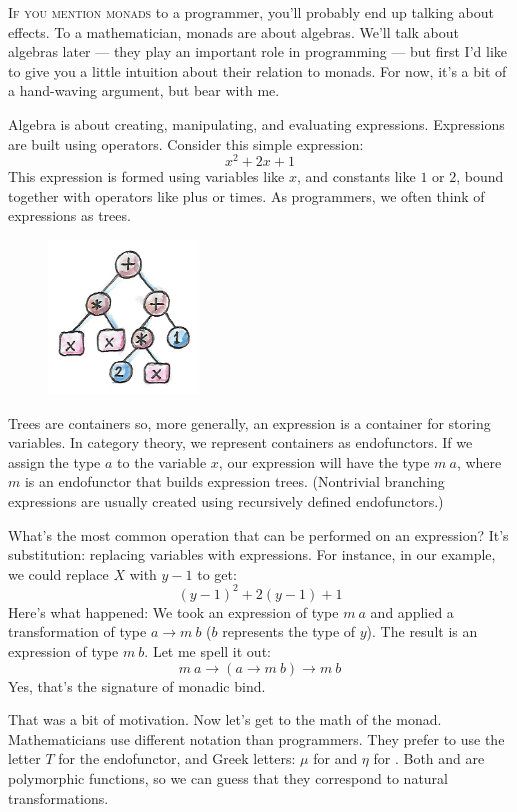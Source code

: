 
\lettrine[lhang=0.17]{I}{f you mention monads} to a programmer, you'll probably end up talking
about effects. To a mathematician, monads are about algebras. We'll talk
about algebras later --- they play an important role in programming ---
but first I'd like to give you a little intuition about their relation
to monads. For now, it's a bit of a hand-waving argument, but bear with
me.

Algebra is about creating, manipulating, and evaluating expressions.
Expressions are built using operators. Consider this simple expression:
\[x^2 + 2 x + 1\]
This expression is formed using variables like $x$, and constants
like $1$ or $2$, bound together with operators like plus or times. As
programmers, we often think of expressions as trees.

\begin{figure}[H]
\centering
\includegraphics[width=40mm]{images/exptree.png}
\end{figure}

\noindent
Trees are containers so, more generally, an expression is a container
for storing variables. In category theory, we represent containers as
endofunctors. If we assign the type $a$ to the variable
$x$, our expression will have the type $m\ a$, where
$m$ is an endofunctor that builds expression trees. (Nontrivial
branching expressions are usually created using recursively defined
endofunctors.)

What's the most common operation that can be performed on an expression?
It's substitution: replacing variables with expressions. For instance,
in our example, we could replace $X$ with $y - 1$ to
get:
\[(y - 1)^2 + 2 (y - 1) + 1\]
Here's what happened: We took an expression of type $m\ a$ and
applied a transformation of type $a \to m\ b$
($b$ represents the type of $y$). The result is an
expression of type $m\ b$. Let me spell it out:
\[m\ a \to (a \to m\ b) \to m\ b\]
Yes, that's the signature of monadic bind.

That was a bit of motivation. Now let's get to the math of the monad.
Mathematicians use different notation than programmers. They prefer to
use the letter $T$ for the endofunctor, and Greek letters: $\mu$ for
 and $\eta$ for . Both  and
 are polymorphic functions, so we can guess that they
correspond to natural transformations.

